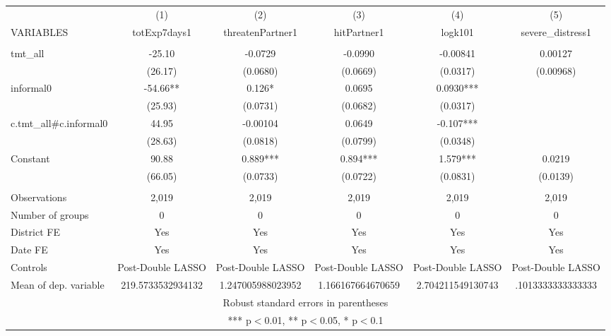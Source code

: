 \documentclass[]{article}
\begin{document}
\begin{tabular}{lccccc} \hline
 & (1) & (2) & (3) & (4) & (5) \\
VARIABLES & totExp7days1 & threatenPartner1 & hitPartner1 & logk101 & severe\_distress1 \\ \hline
 &  &  &  &  &  \\
tmt\_all & -25.10 & -0.0729 & -0.0990 & -0.00841 & 0.00127 \\
 & (26.17) & (0.0680) & (0.0669) & (0.0317) & (0.00968) \\
informal0 & -54.66** & 0.126* & 0.0695 & 0.0930*** &  \\
 & (25.93) & (0.0731) & (0.0682) & (0.0317) &  \\
c.tmt\_all\#c.informal0 & 44.95 & -0.00104 & 0.0649 & -0.107*** &  \\
 & (28.63) & (0.0818) & (0.0799) & (0.0348) &  \\
Constant & 90.88 & 0.889*** & 0.894*** & 1.579*** & 0.0219 \\
 & (66.05) & (0.0733) & (0.0722) & (0.0831) & (0.0139) \\
 &  &  &  &  &  \\
Observations & 2,019 & 2,019 & 2,019 & 2,019 & 2,019 \\
Number of groups & 0 & 0 & 0 & 0 & 0 \\
District FE & Yes & Yes & Yes & Yes & Yes \\
Date FE & Yes & Yes & Yes & Yes & Yes \\
Controls & Post-Double LASSO & Post-Double LASSO & Post-Double LASSO & Post-Double LASSO & Post-Double LASSO \\
 Mean of dep. variable & 219.5733532934132 & 1.247005988023952 & 1.166167664670659 & 2.704211549130743 & .1013333333333333 \\ \hline
\multicolumn{6}{c}{ Robust standard errors in parentheses} \\
\multicolumn{6}{c}{ *** p$<$0.01, ** p$<$0.05, * p$<$0.1} \\
\end{tabular}
\end{document}
